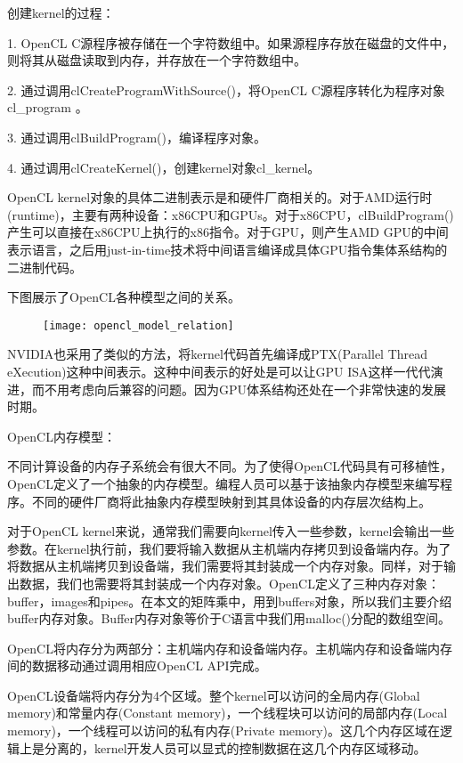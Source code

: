 创建kernel的过程：

1.	OpenCL C源程序被存储在一个字符数组中。如果源程序存放在磁盘的文件中，则将其从磁盘读取到内存，并存放在一个字符数组中。

2.	通过调用clCreateProgramWithSource()，将OpenCL C源程序转化为程序对象 cl\_program 。

3.	通过调用clBuildProgram()，编译程序对象。

4.	通过调用clCreateKernel()，创建kernel对象cl\_kernel。

OpenCL kernel对象的具体二进制表示是和硬件厂商相关的。对于AMD运行时(runtime)，主要有两种设备：x86CPU和GPUs。对于x86CPU，clBuildProgram()产生可以直接在x86CPU上执行的x86指令。对于GPU，则产生AMD GPU的中间表示语言，之后用just-in-time技术将中间语言编译成具体GPU指令集体系结构的二进制代码。

下图展示了OpenCL各种模型之间的关系。
\begin{figure}[htbp]
	\centering
	\texttt{[image: opencl\_model\_relation]}
	\label{fig:opencl_model_relation}
\end{figure}

NVIDIA也采用了类似的方法，将kernel代码首先编译成PTX(Parallel Thread eXecution)这种中间表示。这种中间表示的好处是可以让GPU ISA这样一代代演进，而不用考虑向后兼容的问题。因为GPU体系结构还处在一个非常快速的发展时期。

OpenCL内存模型：

不同计算设备的内存子系统会有很大不同。为了使得OpenCL代码具有可移植性，OpenCL定义了一个抽象的内存模型。编程人员可以基于该抽象内存模型来编写程序。不同的硬件厂商将此抽象内存模型映射到其具体设备的内存层次结构上。

对于OpenCL kernel来说，通常我们需要向kernel传入一些参数，kernel会输出一些参数。在kernel执行前，我们要将输入数据从主机端内存拷贝到设备端内存。为了将数据从主机端拷贝到设备端，我们需要将其封装成一个内存对象。同样，对于输出数据，我们也需要将其封装成一个内存对象。OpenCL定义了三种内存对象：buffer，images和pipes。在本文的矩阵乘中，用到buffers对象，所以我们主要介绍buffer内存对象。Buffer内存对象等价于C语言中我们用malloc()分配的数组空间。

OpenCL将内存分为两部分：主机端内存和设备端内存。主机端内存和设备端内存间的数据移动通过调用相应OpenCL API完成。

OpenCL设备端将内存分为4个区域。整个kernel可以访问的全局内存(Global memory)和常量内存(Constant memory)，一个线程块可以访问的局部内存(Local memory)，一个线程可以访问的私有内存(Private memory)。这几个内存区域在逻辑上是分离的，kernel开发人员可以显式的控制数据在这几个内存区域移动。

